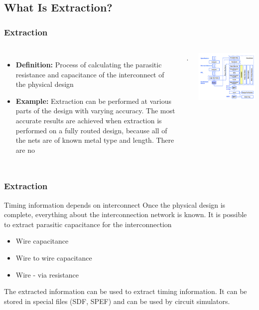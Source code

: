 \documentclass[compress]{beamer}
\begin{document}
\subsection[Extr]{What Is Extraction?}
\begin{frame}
	\frametitle{Extraction}
\begin{columns}
	\begin{itemize}
		\item \textbf {Definition:} Process of calculating the parasitic resistance and capacitance of the interconnect of the physical design
		\item \textbf {Example:} Extraction can be performed at various parts of the design with varying accuracy. The most accurate results are achieved when extraction is performed on a fully routed design, because all of the nets are of known metal type and length. There are no 
	\end{itemize}.
	\begin{center}
		\includegraphics[width=\textwidth]{Extract}
	\end{center}
\end{columns}
\end{frame}
\begin{frame}
	\frametitle{Extraction}
		\begin{block}{Timing information depends on interconnect}
		Once the physical design is complete, everything about the
		interconnection network is known. It is possible to extract parasitic
		capacitance for the interconnection
		\begin{itemize}
			\item Wire capacitance
			\item Wire to wire capacitance
			\item Wire - via resistance
		\end{itemize}
		The extracted information can be used to extract timing
		information. It can be stored in special files (SDF, SPEF) and can
		be used by circuit simulators.
	\end{block}
\end{frame}
\end{document}
